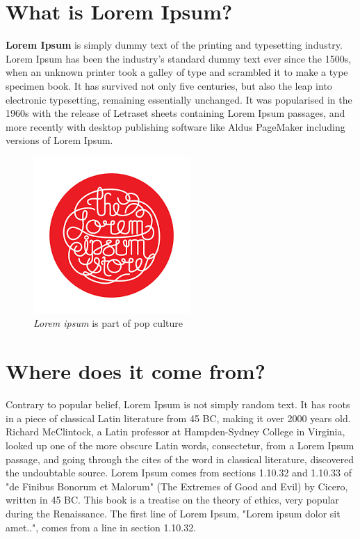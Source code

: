 \documentclass[12pt]{article}
\begin{document}
\begin{multicols}{2}
\section{What is Lorem Ipsum?}
\textbf{Lorem Ipsum} is simply dummy text of the printing and typesetting industry. Lorem Ipsum has been the industry's standard dummy text ever since the 1500s, when an unknown printer took a galley of type and scrambled it to make a type specimen book. It has survived not only five centuries, but also the leap into electronic typesetting, remaining essentially unchanged. It was popularised in the 1960s with the release of Letraset sheets containing Lorem Ipsum passages, and more recently with desktop publishing software like Aldus PageMaker including versions of Lorem Ipsum.

\begin{figure}[H] %
\centering
\includegraphics[width=0.5\linewidth]{ipsum_logo}
\caption{\textit{Lorem ipsum} is part of pop culture\centering}
\end{figure}



\section{Where does it come from?}
Contrary to popular belief, Lorem Ipsum is not simply random text. It has roots in a piece of classical Latin literature from 45 BC, making it over 2000 years old. Richard McClintock, a Latin professor at Hampden-Sydney College in Virginia, looked up one of the more obscure Latin words, consectetur, from a Lorem Ipsum passage, and going through the cites of the word in classical literature, discovered the undoubtable source. Lorem Ipsum comes from sections 1.10.32 and 1.10.33 of "de Finibus Bonorum et Malorum" (The Extremes of Good and Evil) by Cicero, written in 45 BC. This book is a treatise on the theory of ethics, very popular during the Renaissance. The first line of Lorem Ipsum, "Lorem ipsum dolor sit amet..", comes from a line in section 1.10.32.


\end{multicols}
\end{document}
